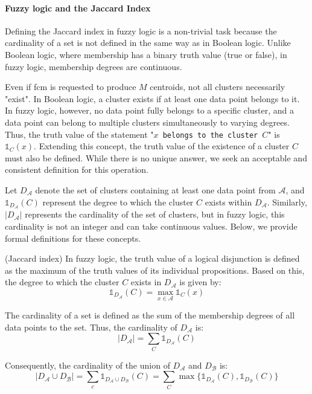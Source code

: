 \paragraph{Fuzzy logic and the Jaccard Index}
\begin{toReview}
\noindent Defining the Jaccard index in fuzzy logic is a non-trivial task because the cardinality of a set is not defined in the same way as in Boolean logic. Unlike Boolean logic, where membership has a binary truth value (true or false), in fuzzy logic, membership degrees are continuous.

\noindent Even if \gls{fcm} is requested to produce $M$ centroids, not all clusters necessarily "exist". In Boolean logic, a cluster exists if at least one data point belongs to it. In fuzzy logic, however, no data point fully belongs to a specific cluster, and a data point can belong to multiple clusters simultaneously to varying degrees. Thus, the truth value of the statement "\texttt{$x$ belongs to the cluster $C$}" is $\mathds{1}_C(x)$. Extending this concept, the truth value of the existence of a cluster $C$ must also be defined. While there is no unique answer, we seek an acceptable and consistent definition for this operation.

\noindent Let $D_\mathcal{A}$ denote the set of clusters containing at least one data point from $\mathcal{A}$, and $\mathds{1}_{D_\mathcal{A}}(C)$ represent the degree to which the cluster $C$ exists within $D_\mathcal{A}$. Similarly, $\left|D_\mathcal{A}\right|$ represents the cardinality of the set of clusters, but in fuzzy logic, this cardinality is not an integer and can take continuous values. Below, we provide formal definitions for these concepts.

\begin{definition}(Jaccard index)
	\label{def:Jaccard_fcm}
	In fuzzy logic, the truth value of a logical disjunction is defined as the maximum of the truth values of its individual propositions. Based on this, the degree to which the cluster $C$ exists in $D_\mathcal{A}$ is given by:
	$$\mathds{1}_{D_\mathcal{A}}(C) = \max_{x\in\mathcal{A}}\mathds{1}_C(x)$$

	\noindent The cardinality of a set is defined as the sum of the membership degrees of all data points to the set. Thus, the cardinality of $D_\mathcal{A}$ is:
	$$|D_\mathcal{A}| = \sum_C \mathds{1}_{D_\mathcal{A}}(C)$$

	\noindent Consequently, the cardinality of the union of $D_\mathcal{A}$ and $D_\mathcal{B}$ is:
	$$|D_\mathcal{A} \cup D_\mathcal{B}| = \sum_c \mathds{1}_{D_\mathcal{A} \cup D_\mathcal{B}}(C) = \sum_C \max\{\mathds{1}_{D_\mathcal{A}}(C), \mathds{1}_{D_\mathcal{B}}(C)\} $$


\end{definition}
\end{toReview}
